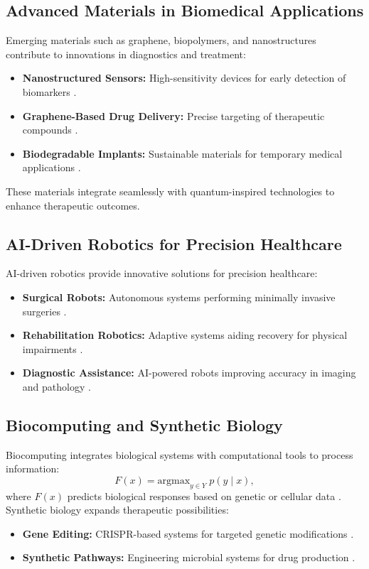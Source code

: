 \documentclass{article}
\theoremstyle{plain}
\begin{document}
\subsection{Advanced Materials in Biomedical Applications}
Emerging materials such as graphene, biopolymers, and nanostructures contribute to innovations in diagnostics and treatment:
\begin{itemize}
    \item \textbf{Nanostructured Sensors:} High-sensitivity devices for early detection of biomarkers \cite{nanomaterials2023}.
    \item \textbf{Graphene-Based Drug Delivery:} Precise targeting of therapeutic compounds \cite{graphene2022}.
    \item \textbf{Biodegradable Implants:} Sustainable materials for temporary medical applications \cite{biopolymers2023}.
\end{itemize}
These materials integrate seamlessly with quantum-inspired technologies to enhance therapeutic outcomes.

\subsection{AI-Driven Robotics for Precision Healthcare}
AI-driven robotics provide innovative solutions for precision healthcare:
\begin{itemize}
    \item \textbf{Surgical Robots:} Autonomous systems performing minimally invasive surgeries \cite{surgicalRobots2023}.
    \item \textbf{Rehabilitation Robotics:} Adaptive systems aiding recovery for physical impairments \cite{rehabRobotics2022}.
    \item \textbf{Diagnostic Assistance:} AI-powered robots improving accuracy in imaging and pathology \cite{diagnosticRobots2023}.
\end{itemize}

\subsection{Biocomputing and Synthetic Biology}
Biocomputing integrates biological systems with computational tools to process information:
\begin{equation}
F(x) = \text{argmax}_{y \in Y} \; p(y \mid x),
\end{equation}
where $F(x)$ predicts biological responses based on genetic or cellular data \cite{biocomputing2023}. Synthetic biology expands therapeutic possibilities:
\begin{itemize}
    \item \textbf{Gene Editing:} CRISPR-based systems for targeted genetic modifications \cite{geneEditing2022}.
    \item \textbf{Synthetic Pathways:} Engineering microbial systems for drug production \cite{syntheticBiology2023}.
\end{itemize}
\end{document}
